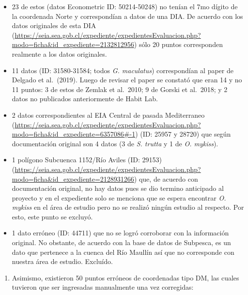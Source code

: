 \documentclass[sn-apa,pdflatex]{sn-jnl}
\providecommand{\tightlist}{%
  \setlength{\itemsep}{0pt}\setlength{\parskip}{0pt}}
\begin{document}
\begin{itemize}
\tightlist
\item
  23 de estos (datos Econometric ID: 50214-50248) no tenían el 7mo
  dígito de la coordenada Norte y correspondían a datos de una DIA. De
  acuerdo con los datos originales de esta DIA
  (\url{https://seia.sea.gob.cl/expediente/expedientesEvaluacion.php?modo=ficha&id_expediente=2132812956})
  sólo 20 puntos corresponden realmente a los datos originales.\\
\item
  11 datos (ID: 31580-31584; todos \emph{G. maculatus}) correspondían al
  paper de Delgado et al.~(2019). Luego de revisar el paper se constató
  que eran 14 y no 11 puntos: 3 de estos de Zemlak et al.~2010; 9 de
  Gorski et al.~2018; y 2 datos no publicados anteriormente de Habit
  Lab.\\
\item
  2 datos correspondientes al EIA Central de pasada Mediterraneo
  (\url{https://seia.sea.gob.cl/expediente/expedientesEvaluacion.php?modo=ficha&id_expediente=6357086\#-1})
  (ID: 25957 y 28720) que según documentación original son 4 datos (3 de
  \emph{S. trutta} y 1 de \emph{O. mykiss}).\\
\item
  1 polígono Subcuenca 1152/Río Aviles (ID: 29153)
  (\url{https://seia.sea.gob.cl/expediente/expedientesEvaluacion.php?modo=ficha&id_expediente=2128931266})
  que, de acuerdo con documentación original, no hay datos pues se dio
  termino anticipado al proyecto y en el expediente solo se menciona que
  se espera encontrar \emph{O. mykiss} en el área de estudio pero no se
  realizó ningún estudio al respecto. Por esto, este punto se excluyó.\\
\item
  1 dato erróneo (ID: 44711) que no se logró corroborar con la
  información original. No obstante, de acuerdo con la base de datos de
  Subpesca, es un dato que pertenece a la cuenca del Río Maullín así que
  no corresponde con nuestra área de estudio. Excluído.
\end{itemize}

\begin{enumerate}
\def\labelenumi{\arabic{enumi}.}
\setcounter{enumi}{1}
\tightlist
\item
  Asimismo, existieron 50 puntos erróneos de coordenadas tipo DM, las
  cuales tuvieron que ser ingresadas manualmente una vez corregidas:\\
\end{enumerate}
\end{document}
